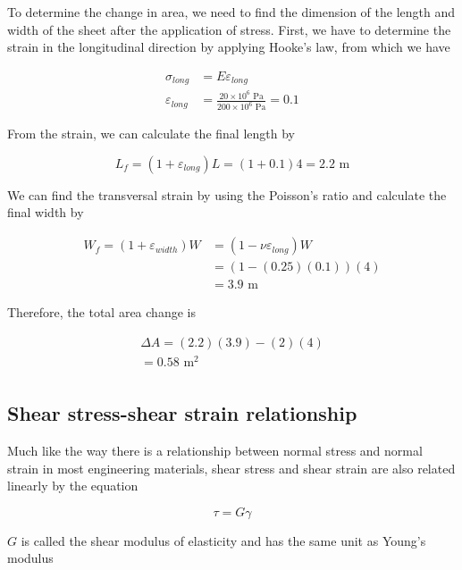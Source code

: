 \documentclass[
10pt,
a4paper,
openany,
svgnames,
]{book} %
\begin{document}
\begin{solution}
To determine the change in area, we need to find the dimension of the length and width of the sheet after the application of stress. First, we have to determine the strain in the longitudinal direction by applying Hooke’s law, from which we have

\begin{align*}
  \sigma _{long} &= E{\varepsilon _{long}} \\
  \varepsilon _{long} &= \frac{20 \times 10^6 \text{ Pa}}{200 \times 10^6 \text{ Pa}} = 0.1
\end{align*}	

From the strain, we can calculate the final length by

\[{L_f} = (1 + {\varepsilon _{long}}){L} = (1 + 0.1)4 = 2.2 \text{ m}\]

We can find the transversal strain by using the Poisson’s ratio and calculate the final width by

\begin{align*}
  W_{f} = (1 + {\varepsilon _{width}})W & = (1 - \nu {\varepsilon _{long}})W \\ 
                                        & = (1 - (0.25)(0.1))(4) \\ 
                                        &= 3.9 \text{ m} 
\end{align*}

Therefore, the total area change is

\[\begin{gathered}
  \Delta A = (2.2)(3.9) - (2)(4) \\ 
   = 0.58 \text{ m}^2 \\ 
\end{gathered} \]
\end{solution}
	
\subsection{Shear stress-shear strain relationship}

Much like the way there is a relationship between normal stress and normal strain in most engineering materials, shear stress and shear strain are also related linearly by the equation

\begin{equation}
  \tau  = G\gamma
\end{equation}

$G$ is called the shear modulus of elasticity and has the same unit as Young’s modulus
\end{document}
